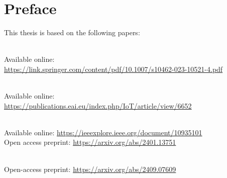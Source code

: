 \chapter*{Preface}
This thesis is based on the following papers:

\begin{paperlist}
    \item \paperI
    \\
    Available online:
    \\\href{https://link.springer.com/content/pdf/10.1007/s10462-023-10521-4.pdf}{
    https://link.springer.com/content/pdf/10.1007/s10462-023-10521-4.pdf}
    \item \paperII
    \\
    Available online:
    \\
    \href{https://publications.eai.eu/index.php/IoT/article/view/6652}{https://publications.eai.eu/index.php/IoT/article/view/6652}

    \item \paperIII
    \\
    Available online:
    \href{https://ieeexplore.ieee.org/document/10935101}{https://ieeexplore.ieee.org/document/10935101}
    \\
    Open access preprint:
    \href{https://arxiv.org/abs/2401.13751}{https://arxiv.org/abs/2401.13751}
    
    \item \paperIV
    \\
    Open-access preprint: 
    \href{https://arxiv.org/abs/2409.07609}{https://arxiv.org/abs/2409.07609}
    

    \item \paperV

    \item \paperVI
    
\end{paperlist}




